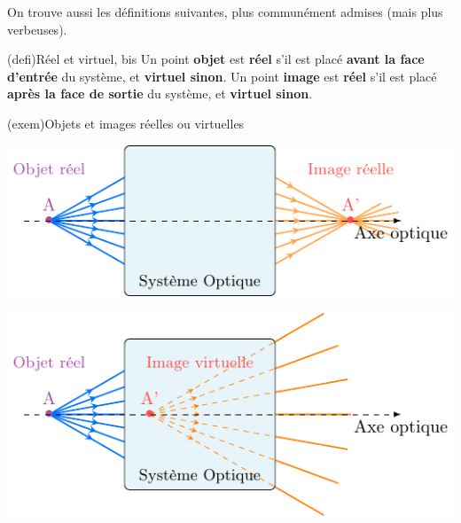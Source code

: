 \documentclass[../../main/main.tex]{subfiles}
\begin{document}
On trouve aussi les définitions suivantes, plus communément admises (mais plus
verbeuses).

\begin{tcb}[label=reelvirt2, sidebyside](defi){{Réel et virtuel, bis}}
	Un point \textbf{objet} est \textbf{réel} s'il est placé \textbf{avant la
		face d'entrée} du système, et \textbf{virtuel sinon}.
	\tcblower
	Un point \textbf{image} est \textbf{réel} s'il est placé \textbf{après la
		face de sortie} du système, et \textbf{virtuel sinon}.
\end{tcb}

\begin{tcb}[label=exem:rellvirt](exem){Objets et images réelles ou virtuelles}
	\begin{minipage}{0.45\linewidth}
		\begin{center}
			\includegraphics[width=\linewidth]{obj_r-img_r}
			\label{fig:objrimgr}
		\end{center}
	\end{minipage}
	\hfill
	\begin{minipage}{0.45\linewidth}
		\begin{center}
			\includegraphics[width=\linewidth]{obj_r-img_v}
			\label{fig:objrimgv}
		\end{center}
	\end{minipage}
	\begin{minipage}{0.45\linewidth}

\end{minipage}
\end{tcb}
\end{document}
